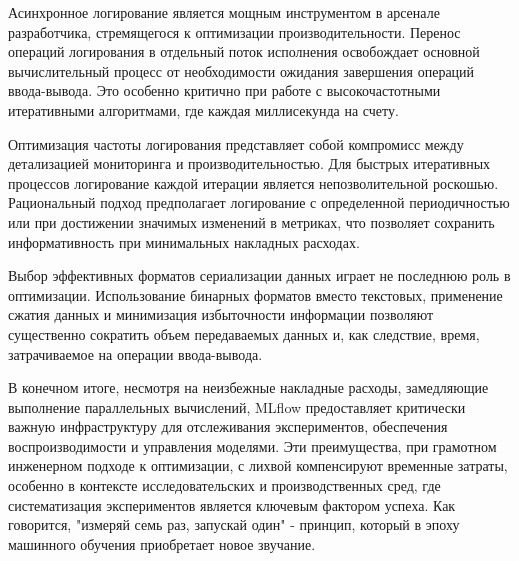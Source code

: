 Асинхронное логирование является мощным инструментом в арсенале разработчика, стремящегося к оптимизации производительности. Перенос операций логирования в отдельный поток исполнения освобождает основной вычислительный процесс от необходимости ожидания завершения операций ввода-вывода. Это особенно критично при работе с высокочастотными итеративными алгоритмами, где каждая миллисекунда на счету.

Оптимизация частоты логирования представляет собой компромисс между детализацией мониторинга и производительностью. Для быстрых итеративных процессов логирование каждой итерации является непозволительной роскошью. Рациональный подход предполагает логирование с определенной периодичностью или при достижении значимых изменений в метриках, что позволяет сохранить информативность при минимальных накладных расходах.

Выбор эффективных форматов сериализации данных играет не последнюю роль в оптимизации. Использование бинарных форматов вместо текстовых, применение сжатия данных и минимизация избыточности информации позволяют существенно сократить объем передаваемых данных и, как следствие, время, затрачиваемое на операции ввода-вывода.

В конечном итоге, несмотря на неизбежные накладные расходы, замедляющие выполнение параллельных вычислений, MLflow предоставляет критически важную инфраструктуру для отслеживания экспериментов, обеспечения воспроизводимости и управления моделями. Эти преимущества, при грамотном инженерном подходе к оптимизации, с лихвой компенсируют временные затраты, особенно в контексте исследовательских и производственных сред, где систематизация экспериментов является ключевым фактором успеха. Как говорится, "измеряй семь раз, запускай один" - принцип, который в эпоху машинного обучения приобретает новое звучание.
